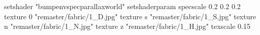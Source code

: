 setshader "bumpenvspecparallaxworld"
setshaderparam specscale 0.2 0.2 0.2
    texture 0 "remaster/fabric/1_D.jpg"
    texture s "remaster/fabric/1_S.jpg"
    texture n "remaster/fabric/1_N.jpg"
    texture z "remaster/fabric/1_H.jpg"
    texscale 0.15